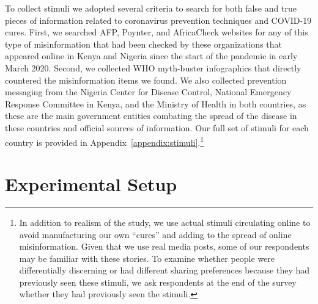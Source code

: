 \documentclass[letterpaper, 12pt, parskip=full,DIV=10]{scrartcl}
\begin{document}
To collect stimuli we adopted several criteria to search for both false and true pieces of information related to coronavirus prevention techniques and COVID-19 cures. First, we searched AFP, Poynter, and AfricaCheck websites for any of this type of misinformation that had been checked by these organizations that appeared online in Kenya and Nigeria since the start of the pandemic in early March 2020. Second, we collected WHO myth-buster infographics that directly countered the misinformation items we found. We also collected prevention messaging from the Nigeria Center for Disease Control, National Emergency Response Committee in Kenya, and the Ministry of Health in both countries, as these are the main government entities combating the spread of the disease in these countries and official sources of information. Our full set of stimuli for each country is provided in Appendix~\ref{appendix:stimuli}.\footnote{In addition to realism of the study, we use actual stimuli circulating online to avoid manufacturing our own ``cures'' and adding to the spread of online misinformation. Given that we use real media posts, some of our respondents may be familiar with these stories. To examine whether people were differentially discerning \citep{nyhan2020facts} or had different sharing preferences because they had previously seen these stimuli, we ask respondents at the end of the survey whether they had previously seen the stimuli.}






\FloatBarrier
\section{Experimental Setup}
\end{document}
